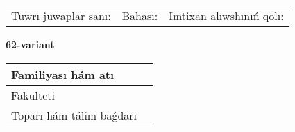 \documentclass{article}
\begin{document}
\vspace{1cm}

\begin{tabular}{lll}
Tuwrı juwaplar sanı: \underline{\hspace{1.5cm}} & 
Bahası: \underline{\hspace{1.5cm}} & 
Imtixan alıwshınıń qolı: \underline{\hspace{2cm}} \\
\end{tabular}

\egroup

\newpage


\textbf{62-variant}\\

\bgroup
\def\arraystretch{1.6} %

\begin{tabular}{|m{5.7cm}|m{9.5cm}|}
\hline
Familiyası hám atı & \\
\hline
Fakulteti  & \\
\hline
Toparı hám tálim baǵdarı  & \\
\hline
\end{tabular}

\vspace{1cm}
\end{document}
